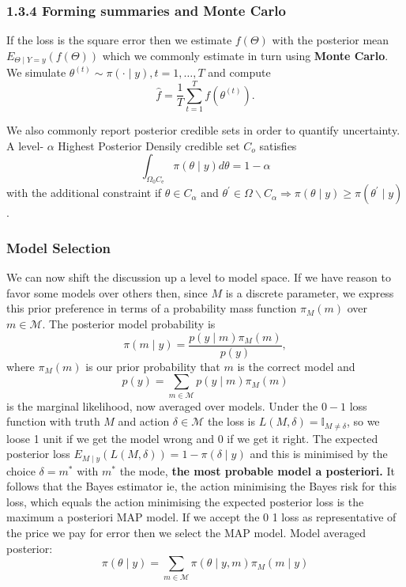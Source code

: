 \documentclass{article}
\begin{document}
\subsubsection{1.3.4 Forming summaries and Monte Carlo}
If the loss is the square error then we estimate $f(\Theta)$ with the posterior mean $E_{\Theta \mid Y=y}(f(\Theta))$ which we commonly estimate in turn using \textbf{Monte Carlo}. We simulate $\theta^{(t)} \sim \pi(\cdot \mid y), t=1, \ldots, T$ and compute
$$
\hat{f}=\frac{1}{T} \sum_{t=1}^T f\left(\theta^{(t)}\right) .
$$

We also commonly report posterior credible sets in order to quantify uncertainty. A level- $\alpha$ Highest Posterior Densily  credible set $C_o$ satisfies
$$
\int_{\Omega_0 C_{\mathrm{e}}} \pi(\theta \mid y) d \theta=1-\alpha
$$
with the additional constraint
if $\theta \in C_\alpha$ and $\theta^{\prime} \in \Omega \backslash C_\alpha \Rightarrow \pi(\theta \mid y) \geq \pi\left(\theta^{\prime} \mid y\right)$.

\subsubsection{Model Selection}
We can now shift the discussion up a level to model space. If we have reason to favor some models over others then, since $M$ is a discrete parameter, we express this prior preference in terms of a probability mass function $\pi_M(m)$ over $m \in \mathcal{M}$.  The posterior model probability is
$$
\pi(m \mid y)=\frac{p(y \mid m) \pi_M(m)}{p(y)},
$$
where $\pi_M(m)$ is our prior probability that $m$ is the correct model and
$$
p(y)=\sum_{m \in \mathcal{M}} p(y \mid m) \pi_M(m)
$$
is the marginal likelihood, now averaged over models.
Under the $0-1$ loss function with truth $M$ and action $\delta \in \mathcal{M}$ the loss is $L(M, \delta)=\mathbb{I}_{M \neq \delta}$, so we loose 1 unit if we get the model wrong and 0 if we get it right. 
The expected posterior loss $E_{M \mid y}(L(M, \delta))=1-\pi(\delta \mid y)$ and this is minimised by the choice $\delta=m^*$ with $m^*$ the mode, \textbf{the most probable model a posteriori.} 
It follows that the Bayes estimator ie, the action minimising the Bayes risk for this loss, which equals the action minimising the expected posterior loss is the maximum a posteriori MAP model. If we accept the 0 1 loss as representative of the price we  pay for error then we select the MAP model.  
Model averaged posterior:
$$
\pi(\theta \mid y)=\sum_{m \in \mathcal{M}} \pi(\theta \mid y, m) \pi_M(m \mid y)
$$
\end{document}
